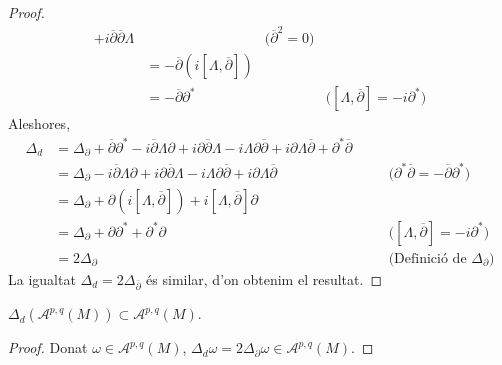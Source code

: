 \begin{proposicio}
\begin{proof}
\begin{align*}
            +i\overline{\partial}\overline{\partial}\Lambda
            &\quad&\textrm{($\overline{\partial}^{2}=0$)}\\
            &=-\overline{\partial}(i[\Lambda,\overline{\partial}])\\
            &=-\overline{\partial}\partial^{*}
            &\quad&\textrm{($[\Lambda,\overline{\partial}]=-i\partial^{*}$)}
        \end{align*}
        Aleshores,
        \begin{align*}
            \Delta_{d}
            &=\Delta_{\partial}
            +\overline{\partial}\partial^{*}
            -i\overline{\partial}\Lambda\partial
            +i\partial\overline{\partial}\Lambda
            -i\Lambda\partial\overline{\partial}
            +i\partial\Lambda\overline{\partial}
            +\partial^{*}\overline{\partial}\\
            &=\Delta_{\partial}
            -i\overline{\partial}\Lambda\partial
            +i\partial\overline{\partial}\Lambda
            -i\Lambda\partial\overline{\partial}
            +i\partial\Lambda\overline{\partial}
            &\quad&\textrm{($\partial^{*}\overline{\partial}=-\overline{\partial}\partial^{*}$)}\\
            &=\Delta_{\partial}
            +\partial(i[\Lambda,\overline{\partial}])
            +i[\Lambda,\overline{\partial}]\partial\\
            &=\Delta_{\partial}
            +\partial\partial^{*}
            +\partial^{*}\partial
            &\quad&\textrm{($[\Lambda,\overline{\partial}]=-i\partial^{*}$)}\\
            &=2\Delta_{\partial}
            &\quad&\textrm{(Definició de $\Delta_{\partial}$)}
        \end{align*}
        La igualtat $\Delta_{d}=2\Delta_{\overline{\partial}}$ és similar, d'on obtenim el resultat.
    \end{proof}
\end{proposicio}
\begin{corolari}
    $\Delta_{d}(\mathcal{A}^{p,q}(M))\subset\mathcal{A}^{p,q}(M)$.
    \begin{proof}
        Donat $\omega\in\mathcal{A}^{p,q}(M)$, $\Delta_{d}\omega=2\Delta_{\partial}\omega\in\mathcal{A}^{p,q}(M)$.
    \end{proof}
\end{corolari}
